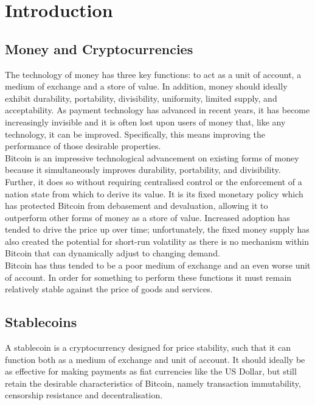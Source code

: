 \section{Introduction}

\subsection{Money and Cryptocurrencies}

The technology of money has three key functions: to act as a unit of account, a medium of
exchange and a store of value. In addition, money should ideally exhibit durability,
portability, divisibility, uniformity, limited supply, and acceptability.
As payment technology has advanced in recent years, it has become increasingly invisible
and it is often lost upon users of money that, like any technology, it can be improved.
Specifically, this means improving the performance of those desirable properties. \\

\noindent Bitcoin is an impressive technological advancement on existing forms of money because it
simultaneously improves durability, portability, and divisibility.
Further, it does so without requiring centralised control or the enforcement of a nation state from which to derive its value.
It is its fixed monetary policy which has protected Bitcoin from debasement and
devaluation, allowing it to outperform other forms of money as a store of value. Increased adoption
has tended to drive the price up over time; unfortunately, the fixed money supply has also created the
potential for short-run volatility as there is no mechanism within Bitcoin that can dynamically
adjust to changing demand. \\

\noindent Bitcoin has thus tended to be a poor medium of exchange and an even worse unit of account.
In order for something to perform these functions it must remain
relatively stable against the price of goods and services.

\subsection{Stablecoins}

\noindent A stablecoin is a cryptocurrency designed for price stability, such that it can function both as a medium of exchange and unit of account. It should ideally be as effective for making payments
as fiat currencies like the US Dollar, but still retain the desirable characteristics of Bitcoin, namely
transaction immutability, censorship resistance and decentralisation. \\

